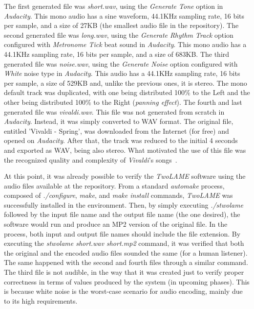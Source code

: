 The first generated file was \textit{short.wav}, using the \textit{Generate Tone} option in \textit{Audacity}. This mono audio has a sine waveform, 44.1KHz sampling rate, 16 bits per sample, and a size of 27KB (the smallest audio file in the repository). 
The second generated file was \textit{long.wav}, using the \textit{Generate Rhythm Track} option configured with \textit{Metronome Tick} beat sound in \textit{Audacity}. This mono audio has a 44.1KHz sampling rate, 16 bits per sample, and a size of 683KB. 
The third generated file was \textit{noise.wav}, using the \textit{Generate Noise} option configured with \textit{White} noise type in \textit{Audacity}. This audio has a 44.1KHz sampling rate, 16 bits per sample, a size of 529KB and, unlike the previous ones, it is stereo. The mono default track was duplicated, with one being distributed 100\% to the Left and the other being distributed 100\% to the Right (\textit{panning effect}). 
The fourth and last generated file was \textit{vivaldi.wav}. This file was not generated from scratch in \textit{Audacity}. Instead, it was simply converted to WAV format. The original file, entitled 'Vivaldi - Spring', was downloaded from the Internet (for free) and opened on \textit{Audacity}. After that, the track was reduced to the initial 4 seconds and exported as WAV, being also stereo. What motivated the use of this file was the recognized quality and complexity of \textit{Vivaldi}'s songs~\cite{vivaldi}.

At this point, it was already possible to verify the \textit{TwoLAME} software using the audio files available at the repository. From a standard \textit{automake} process, composed of \textit{./configure}, \textit{make}, and \textit{make install} commands, \textit{TwoLAME} was successfully installed in the environment. Then, by simply executing \textit{./stwolame} followed by the input file name and the output file name (the one desired), the software would run and produce an MP2 version of the original file. 
In the process, both input and output file names should include the file extension. By executing the \textit{stwolame short.wav short.mp2} command, it was verified that both the original and the encoded audio files sounded the same (for a human listener). The same happened with the second and fourth files through a similar command. 
The third file is not audible, in the way that it was created just to verify proper correctness in terms of values produced by the system (in upcoming phases). This is because white noise is the worst-case scenario for audio encoding, mainly due to its high requirements. 

